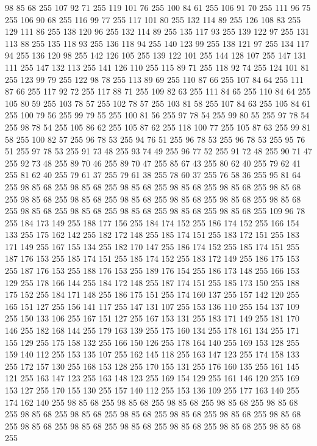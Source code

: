 98 85 68 255 107 92 71 255 119 101 76 255 100 84 61 255 106 91 70 255 111 96 75 255 106 90 68 255 116 99 77 255 117 101 80 255 132 114 89 255 126 108 83 255 129 111 86 255 138 120 96 255 132 114 89 255 135 117 93 255 139 122 97 255 131 113 88 255 135 118 93 255 136 118 94 255 140 123 99 255 138 121 97 255 134 117 94 255 136 120 98 255 142 126 105 255 139 122 101 255 144 128 107 255 147 131 111 255 147 132 113 255 141 126 110 255 115 89 71 255 118 92 74 255 124 101 81 255 123 99 79 255 122 98 78 255 113 89 69 255 110 87 66 255 107 84 64 255 111 87 66 255 117 92 72 255 117 88 71 255 109 82 63 255 111 84 65 255 110 84 64 255 105 80 59 255 103 78 57 255 102 78 57 255 103 81 58 255 107 84 63 255 105 84 61 255 100 79 56 255 99 79 55 255 100 81 56 255 97 78 54 255 99 80 55 255 97 78 54 255 98 78 54 255 105 86 62 255 105 87 62 255 118 100 77 255 105 87 63 255 99 81 58 255 100 82 57 255 96 78 53 255 94 76 51 255
96 78 53 255 96 78 53 255 95 76 51 255 97 78 53 255 91 73 48 255 93 74 49 255 96 77 52 255 91 72 48 255 90 71 47 255 92 73 48 255 89 70 46 255 89 70 47 255 85 67 43 255 80 62 40 255 79 62 41 255 81 62 40 255 79 61 37 255 79 61 38 255 78 60 37 255 76 58 36 255 95 81 64 255 98 85 68 255 98 85 68 255 98 85 68 255 98 85 68 255 98 85 68 255 98 85 68 255 98 85 68 255 98 85 68 255 98 85 68 255 98 85 68 255 98 85 68 255 98 85 68 255 98 85 68 255 98 85 68 255 98 85 68 255 98 85 68 255 98 85 68 255 109 96 78 255 184 173 149 255 188 177 156 255 184 174 152 255 186 174 152 255 166 154 133 255 175 162 142 255 182 172 148 255 185 174 151 255 183 172 151 255 183 171 149 255 167 155 134 255 182 170 147 255 186 174 152 255 185 174 151 255 187 176 153 255 185 174 151 255 185 174 152 255 183 172 149 255 186 175 153 255 187 176 153 255 188 176 153 255 189 176 154 255 186 173 148 255 166 153 129 255 178 166 144 255
184 172 148 255 187 174 151 255 185 173 150 255 188 175 152 255 184 171 148 255 186 175 151 255 174 160 137 255 157 142 120 255 165 151 127 255 156 141 117 255 147 131 107 255 153 136 110 255 154 137 109 255 150 133 106 255 167 151 127 255 167 153 131 255 183 171 149 255 181 170 146 255 182 168 144 255 179 163 139 255 175 160 134 255 178 161 134 255 171 155 129 255 175 158 132 255 166 150 126 255 178 164 140 255 169 153 128 255 159 140 112 255 153 135 107 255 162 145 118 255 163 147 123 255 174 158 133 255 172 157 130 255 168 153 128 255 170 155 131 255 176 160 135 255 161 145 121 255 163 147 123 255 163 148 123 255 169 154 129 255 161 146 120 255 169 153 127 255 170 155 130 255 157 140 112 255 153 136 109 255 177 163 140 255 174 162 140 255 98 85 68 255 98 85 68 255 98 85 68 255 98 85 68 255 98 85 68 255 98 85 68 255 98 85 68 255 98 85 68 255 98 85 68 255 98 85 68 255 98 85 68 255 98 85 68 255 98 85 68 255 98 85 68 255 98 85 68 255 98 85 68 255 98 85 68 255
